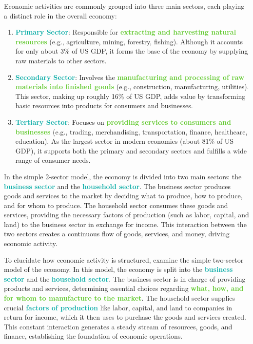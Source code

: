 \documentclass[twoside]{article}
\newcommand{\highlightbluetext}[1]{\textcolor[HTML]{09ACA6}{\textbf{#1}}}
\newcommand{\highlightgreentext}[1]{\textcolor[HTML]{62C92F}{\textbf{#1}}}
\numberwithin{equation}{section}
\begin{document}
	Economic activities are commonly grouped into three main sectors, each playing a distinct role in the overall economy:
	\begin{enumerate}
		\item \highlightbluetext{Primary Sector}: Responsible for \highlightgreentext{extracting and harvesting natural resources} (e.g., agriculture, mining, forestry, fishing). Although it accounts for only about 3\% of US GDP, it forms the base of the economy by supplying raw materials to other sectors.
		\item \highlightbluetext{Secondary Sector}: Involves the \highlightgreentext{manufacturing and processing of raw materials into finished goods} (e.g., construction, manufacturing, utilities). This sector, making up roughly 16\% of US GDP, adds value by transforming basic resources into products for consumers and businesses.
		\item \highlightbluetext{Tertiary Sector}: Focuses on \highlightgreentext{providing services to consumers and businesses} (e.g., trading, merchandising, transportation, finance, healthcare, education). As the largest sector in modern economies (about 81\% of US GDP), it supports both the primary and secondary sectors and fulfills a wide range of consumer needs.
	\end{enumerate}

	In the simple 2-sector model, the economy is divided into two main sectors: the \highlightbluetext{business sector} and the \highlightbluetext{household sector}. The business sector produces goods and services to the market by deciding what to produce, how to produce, and for whom to produce. The household sector consumes these goods and services, providing the necessary factors of production (such as labor, capital, and land) to the business sector in exchange for income. This interaction between the two sectors creates a continuous flow of goods, services, and money, driving economic activity.

	To elucidate how economic activity is structured, examine the simple two-sector model of the economy. In this model, the economy is split into the \highlightbluetext{business sector} and the \highlightbluetext{household sector}. The business sector is in charge of providing products and services, determining essential choices regarding \highlightgreentext{what, how, and for whom to manufacture to the market}. The household sector supplies crucial \highlightbluetext{factors of production} like labor, capital, and land to companies in return for income, which it then uses to purchase the goods and services created. This constant interaction generates a steady stream of resources, goods, and finance, establishing the foundation of economic operations.
\end{document}

